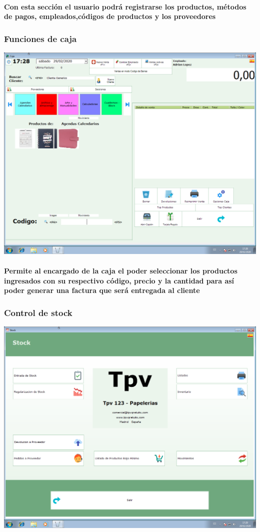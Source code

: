\documentclass[12pt,a4paper]{ articule }
\begin{document}
\paragraph{Con esta sección el usuario podrá registrarse los productos, métodos de pagos, empleados,códigos de productos y los proveedores}

\subsubsection*{Funciones de caja}
\includegraphics[scale=0.35]{Caja.png} 
\paragraph{Permite al encargado de la caja el poder seleccionar los productos ingresados con su respectivo código, precio y la cantidad para así poder generar una factura que será entregada al cliente}

\subsubsection*{Control de stock}
\includegraphics[scale=0.35]{Stock.png}
\end{document}
